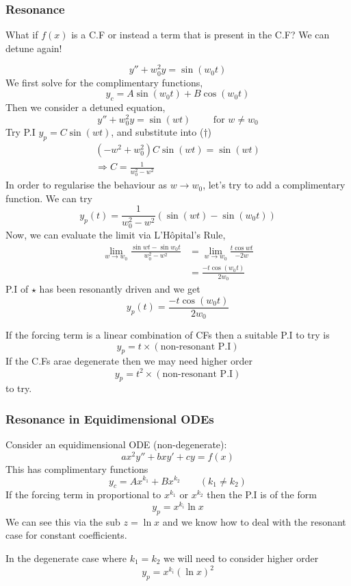 \documentclass{article}
\begin{document}
\subsubsection*{Resonance}
What if $f(x)$ is a C.F or instead a term that is present in the C.F?
We can detune again!
\begin{eg}
    \[
        y'' + w_0^2 y = \sin (w_0 t)  
    \]
    We first solve for the complimentary functions,
    \[
        y_c = A \sin (w_0 t) + B \cos (w_0 t) \tag{$\star$}  
    \]
    Then we consider a detuned equation,
    \[
        y'' + w_0^2 y = \sin (wt) \qquad \text{ for } w \neq w_0\tag{$\dagger$}  
    \]
    Try P.I $y_p = C \sin (wt)$, and substitute into ($\dagger$)
    \begin{align*}
        (-w^2 + w_0^2) C \sin (wt) = \sin (wt) \\
        \Rightarrow C = \frac{1}{w_0^2 -w^2}
    \end{align*}
    In order to regularise the behaviour as $w \rightarrow w_0$, 
    let's try to add a complimentary function. We can try
    \[
        y_p (t) = \frac{1}{w_0^2 -w^2} (\sin (wt) - \sin (w_0t))
    \]
    Now, we can evaluate the limit via L'H\^opital's Rule,
    \begin{align*}
        \lim_{w \rightarrow w_0} \frac{\sin wt - \sin w_0 t}{w_0^2 -w^2} &= \lim_{w \rightarrow w_0} \frac{t \cos wt}{-2w} \\
        &= \frac{-t \cos (w_0t)}{2 w_0}
    \end{align*}
    P.I of $\star$ has been resonantly driven and we get
    \[
        y_p(t) = \frac{-t \cos (w_0t)}{2 w_0}
    \]
\end{eg}

\begin{remark}
    If the forcing term is a linear combination of CFs then a suitable P.I to try is
    \[
        y_p = t \times (\text{non-resonant P.I})  
    \]
    If the C.Fs arae degenerate then we may need higher order 
    \[
        y_p = t^2 \times (\text{non-resonant P.I})  
    \]
    to try.
\end{remark}
\subsubsection*{Resonance in Equidimensional ODEs}
Consider an equidimensional ODE (non-degenerate):
\[
    a x^2 y'' + bxy' + cy = f(x)
\]
This has complimentary functions
\[
    y_c = A x^{k_1} + B x^{k_2} \qquad (k_1 \neq k_2)
\]
If the forcing term in proportional to $x^{k_1}$ or $x^{k_2}$ then the P.I is of the form
\[
    y_p = x^{k_i} \ln x  
\]
We can see this via the sub $z = \ln x$ and we know how to deal with the resonant case for constant coefficients.
\begin{remark}
    In the degenerate case where $k_1 = k_2$ we will need to consider higher order
    \[
        y_p = x^{k_i}(\ln x )^2
    \]
\end{remark}
\end{document}
